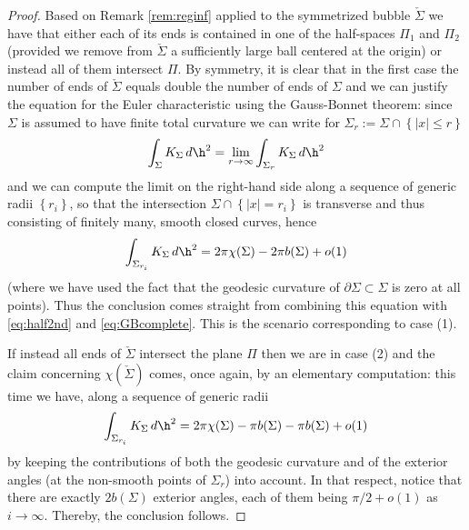         	\begin{proof}
        		Based on Remark \ref{rem:reginf} applied to the symmetrized bubble $\check{\Sigma}$ we have that either each of its ends is contained in one of the half-spaces $\Pi_1$ and $\Pi_2$ (provided we remove from $\check{\Sigma}$ a sufficiently large ball centered at the origin) or instead all of them intersect $\Pi$. By symmetry, it is clear that in the first case the number of ends of $\check{\Sigma}$ equals double the number of ends of $\Sigma$ and we can justify the equation for the Euler characteristic using the Gauss-Bonnet theorem: since $\Sigma$ is assumed to have finite total curvature we can write for $\Sigma_r:=\Sigma \cap \left\{|x|\leqslant r\right\}$
        		\[
        		\int_{\Sigma}K_{\Sigma}\,d\h^2=\lim_{r\to\infty}\int_{\Sigma_r} K_{\Sigma}\,d\h^2
        		\]
        		and we can compute the limit on the right-hand side along a sequence of generic radii $\left\{r_i\right\}$, so that the intersection $\Sigma\cap \left\{|x|=r_i\right\}$ is transverse and thus consisting of finitely many, smooth closed curves, hence
        		\[
        		\int_{\Sigma_{r_i}} K_{\Sigma}\,d\h^2=2\pi \chi(\Sigma)-2\pi b(\Sigma)+o(1)
        		\]
        		(where we have used the fact that the geodesic curvature of $\partial\Sigma\subset\Sigma$ is zero at all points).
        		Thus the conclusion comes straight from combining this equation with \eqref{eq:half2nd} and \eqref{eq:GBcomplete}. This is the scenario corresponding to case (1).
        		
        		If instead all ends of $\check{\Sigma}$ intersect the plane $\Pi$ then we are in case (2) and the claim concerning $\chi(\check{\Sigma})$ comes, once again, by an elementary computation: this time we have, along a sequence of generic radii 
        		\[
        		\int_{\Sigma_{r_i}} K_{\Sigma}\,d\h^2=2\pi \chi(\Sigma)-\pi b(\Sigma)-\pi b(\Sigma)+o(1)
        		\]
        		by keeping the contributions of both the geodesic curvature and of the exterior angles (at the non-smooth points of $\Sigma_r$) into account. In that respect, notice that  there are exactly $2b(\Sigma)$ exterior angles, each of them being $\pi/2+o(1)$ as $i\to\infty$. Thereby, the conclusion follows.
        	\end{proof}	
        	
        	
        	
        		
        		
        		
        		
        	
        
